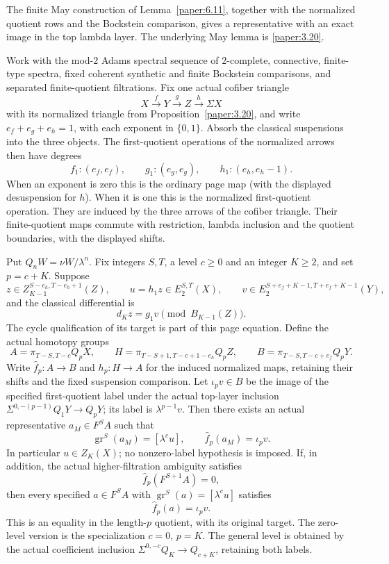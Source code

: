 \begin{theorem}
\label{sem:ProofTools:ml-finite-core}
The finite May construction of Lemma~\ref{paper:6.11}, together with
the normalized quotient rows and the Bockstein comparison, gives a
representative with an exact image in the top lambda layer.
The underlying May lemma is \ref{paper:3.20}.\par
Work with the mod-$2$ Adams spectral sequence of $2$-complete, connective,
finite-type spectra, fixed coherent synthetic and finite Bockstein comparisons,
and separated finite-quotient filtrations.
Fix one actual cofiber triangle
\[
 X\xrightarrow fY\xrightarrow gZ\xrightarrow h\Sigma X
\]
with its normalized triangle from Proposition~\ref{paper:3.20}, and write
$e_f+e_g+e_h=1$, with each exponent in $\{0,1\}$.
Absorb the classical suspensions into the three objects. The first-quotient
operations of the normalized arrows then have degrees
\[
 f_1:(e_f,e_f),\qquad g_1:(e_g,e_g),\qquad h_1:(e_h,e_h-1).
\]
When an exponent is zero this is the ordinary page map (with the displayed
desuspension for $h$). When it is one this is the normalized
first-quotient operation. They are induced by the three arrows of the cofiber triangle.
Their finite-quotient maps commute with restriction, lambda inclusion
and the quotient boundaries, with the displayed shifts.

Put $Q_nW=\nu W/\lambda^n$. Fix integers $S,T$, a level $c\geq0$ and
an integer $K\geq2$, and set $p=c+K$. Suppose
\[
 z\in Z_{K-1}^{S-e_h,T-e_h+1}(Z),\qquad
 u=h_1z\in E_2^{S,T}(X),\qquad
 v\in E_2^{S+e_f+K-1,T+e_f+K-1}(Y),
\]
and the classical differential is
\[
 d_Kz=g_1v\pmod{B_{K-1}(Z)}.
\]
The cycle qualification of its target is part of this page equation.
Define the actual homotopy groups
\[
 A=\pi_{T-S,T-c}Q_pX,\qquad
 H=\pi_{T-S+1,T-c+1-e_h}Q_pZ,\qquad
 B=\pi_{T-S,T-c+e_f}Q_pY.
\]
Write $\widehat f_p:A\to B$ and $h_p:H\to A$ for the induced normalized
maps, retaining their shifts and the fixed suspension comparison.
Let $\iota_pv\in B$ be the image of the specified first-quotient label
under the actual top-layer inclusion
$\Sigma^{0,-(p-1)}Q_1Y\to Q_pY$; its label is $\lambda^{p-1}v$.
Then there exists an actual representative $a_M\in F^SA$ such that
\[
 \operatorname{gr}^{S}(a_M)=[\lambda^cu],\qquad
 \widehat f_p(a_M)=\iota_pv.
\tag{M}
\]
In particular $u\in Z_K(X)$; no nonzero-label hypothesis is imposed.
If, in addition, the actual higher-filtration ambiguity satisfies
\[
 \widehat f_p(F^{S+1}A)=0,
\tag{A}
\]
then every specified $a\in F^SA$ with
$\operatorname{gr}^{S}(a)=[\lambda^cu]$ satisfies
\[
 \widehat f_p(a)=\iota_pv.
\tag{Cores}
\]
This is an equality in the length-$p$ quotient, with its original target.
The zero-level version is the specialization $c=0$, $p=K$.
The general level is obtained by the actual coefficient inclusion
$\Sigma^{0,-c}Q_K\to Q_{c+K}$, retaining both labels.
\end{theorem}
